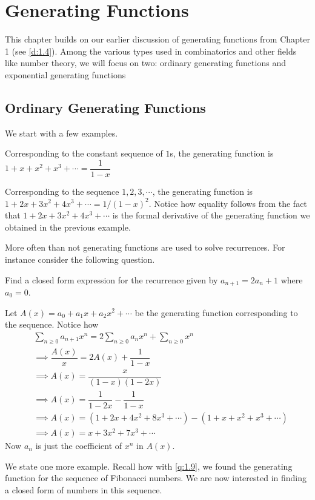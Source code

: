 \chapter{Generating Functions}
This chapter builds on our earlier discussion of generating functions from Chapter 1 (see \cref{d:1.4}). Among the various types used in combinatorics and other fields like number theory, we will focus on two: ordinary generating functions and exponential generating functions
\section{Ordinary Generating Functions}
We start with a few examples.
\begin{example}
Corresponding to the constant sequence of $1$s, the generating function is $1+x+x^2+x^3+\cdots = \dfrac{1}{1-x}$
\end{example}
\begin{example}
Corresponding to the sequence $1,2,3,\cdots$, the generating function is $1+2x+3x^2+4x^3+\cdots = 1/(1-x)^2$. Notice how equality follows from the fact that $1+2x+3x^2+4x^3+\cdots$ is the formal derivative of the generating function we obtained in the previous example.
\end{example}
More often than not generating functions are used to solve recurrences. For instance consider the following question.
\begin{question}
Find a closed form expression for the recurrence given by $a_{n+1}=2a_n+1$ where $a_0=0$. 
\end{question}
\begin{solution}
Let $A(x)=a_0+a_1x+a_2x^2+\cdots$ be the generating function corresponding to the sequence. Notice how 
\begin{align*}
    &\sum_{n\geq 0}a_{n+1}x^n = 2\sum_{n\geq 0}a_nx^n+ \sum_{n\geq 0}x^n \\
    &\implies \dfrac{A(x)}{x} = 2A(x) + \dfrac{1}{1-x} \\
    &\implies A(x) = \dfrac{x}{(1-x)(1-2x)} \\
    &\implies A(x) = \dfrac{1}{1-2x}-\dfrac{1}{1-x} \\
    &\implies A(x) = (1+2x+4x^2+8x^3+\cdots)-(1+x+x^2+x^3+\cdots) \\
    &\implies A(x) = x+3x^2+7x^3+\cdots
\end{align*}
Now $a_n$ is just the coefficient of $x^n$ in $A(x)$. 
\end{solution}
We state one more example. Recall how with \cref{q:1.9}, we found the generating function for the sequence of Fibonacci numbers. We are now interested in finding a closed form of numbers in this sequence. 
